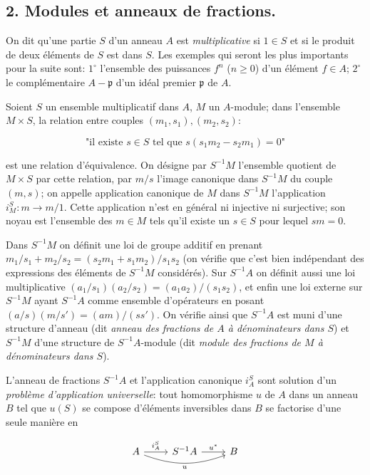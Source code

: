 
\subsection*{2. Modules et anneaux de fractions.}

On dit qu'une partie $S$ d'un anneau $A$ est \emph{multiplicative} si $1 \in S$ et si le produit de deux éléments de $S$ est dans $S$. Les exemples qui seront les plus importants pour la suite sont: $1^\circ$ l'ensemble des puissances $f^n$ ($n \geq 0$) d'un élément $f \in A$; $2^\circ$ le complémentaire $A - \mathfrak{p}$ d'un idéal premier $\mathfrak{p}$ de $A$.

Soient $S$ un ensemble multiplicatif dans $A$, $M$ un $A$-module; dans l'ensemble $M \times S$, la relation entre couples $(m_1, s_1), (m_2, s_2)$:

$$ \text{"il existe } s \in S \text{ tel que } s(s_1m_2 - s_2m_1) = 0 \text{"} $$

est une relation d'équivalence. On désigne par $S^{-1}M$ l'ensemble quotient de $M \times S$ par cette relation, par $m/s$ l'image canonique dans $S^{-1}M$ du couple $(m,s)$; on appelle application canonique de $M$ dans $S^{-1}M$ l'application $i_M^S: m \to m/1$. Cette application n'est en général ni injective ni surjective; son noyau est l'ensemble des $m \in M$ tels qu'il existe un $s \in S$ pour lequel $sm = 0$.

Dans $S^{-1}M$ on définit une loi de groupe additif en prenant $m_1/s_1 + m_2/s_2 = (s_2m_1 + s_1m_2)/s_1s_2$ (on vérifie que c'est bien indépendant des expressions des éléments de $S^{-1}M$ considérés). Sur $S^{-1}A$ on définit aussi une loi multiplicative $(a_1/s_1)(a_2/s_2) = (a_1a_2)/(s_1s_2)$, et enfin une loi externe sur $S^{-1}M$ ayant $S^{-1}A$ comme ensemble d'opérateurs en posant $(a/s)(m/s') = (am)/(ss')$. On vérifie ainsi que $S^{-1}A$ est muni d'une structure d'anneau (dit \emph{anneau des fractions de $A$ à dénominateurs dans $S$}) et $S^{-1}M$ d'une structure de $S^{-1}A$-module (dit \emph{module des fractions de $M$ à dénominateurs dans $S$}).

L'anneau de fractions $S^{-1}A$ et l'application canonique $i_A^S$ sont solution d'un \emph{problème d'application universelle}: tout homomorphisme $u$ de $A$ dans un anneau $B$ tel que $u(S)$ se compose d'éléments inversibles dans $B$ se factorise d'une seule manière en

$$ \begin{tikzcd} A \arrow[r, "i_A^S"] \arrow[rr, bend right=20, "u"'] & S^{-1}A \arrow[r, "u^*"] & B \end{tikzcd} $$


